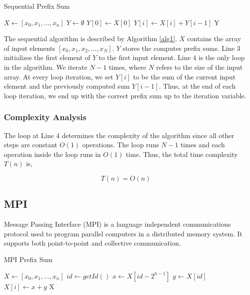 \documentclass[11pt]{article}
\begin{document}
\renewcommand{\algorithmiccomment}[1]{// #1}
\begin{algorithm}
\caption{Sequential Prefix Sum}
\label{alg1}
\begin{algorithmic}[1]
  \State $X \leftarrow [x_{0}, x_{1}, \ldots, x_{n}]$
  \State $Y \leftarrow \emptyset$
  \State $Y[0] \leftarrow X[0]$
    \State $Y[i] \leftarrow X[i] + Y[i-1]$
  \EndFor
  \State \Return Y
\end{algorithmic}
\end{algorithm}

The sequential algorithm is described by Algorithm \ref{alg1}. $X$ contains the array of input elements $[x_{0}, x_{1}, x_{2},\ldots, x_{N}]$. $Y$ stores the computes prefix sums. Line 3 initializes the first element of $Y$ to the first input element. Line 4 is the only loop in the algorithm. We iterate $N-1$ times, where $N$ refers to the size of the input array. At every loop iteration, we set $Y[i]$ to be the sum of the current input element and the previously computed sum $Y[i-1]$. Thus, at the end of each loop iteration, we end up with the correct prefix sum up to the iteration variable. 
\subsubsection{Complexity Analysis}

The loop at Line 4 determines the complexity of the algorithm since all other steps are constant $O(1)$ operations. The loop runs $N-1$ times and each operation inside the loop runs in $O(1)$ time. Thus, the total time complexity $T(n)$ is,

\[T(n) = O(n)\]


\subsection{MPI}
Message Passing Interface (MPI) is a language independent communications protocol used to program parallel computers in a distributed memory system. It supports both point-to-point and collective communication. 

\begin{algorithm}
\caption{MPI Prefix Sum}
\label{alg2}
\begin{algorithmic}[1]
  \State $X \leftarrow [x_{0}, x_{1}, \ldots, x_{n}]$
      \State $id \leftarrow getId()$
            \State $x \leftarrow X[id - 2^{h-1}]$
            \State $y \leftarrow X[id]$
            \State $X[i] \leftarrow x + y$
        \Else
            \State {}
        \EndIf
      \EndFor
    \EndFor
  \State \Return X
\end{algorithmic}
\end{algorithm}
\end{document}

